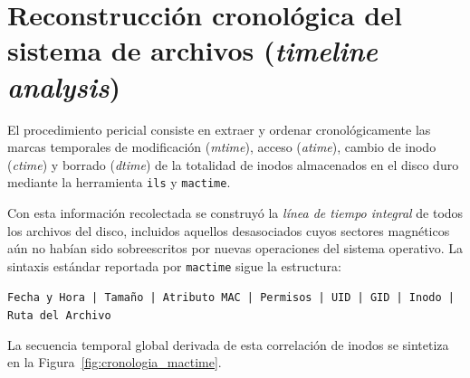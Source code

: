 \section{Reconstrucción cronológica del sistema de archivos (\textit{timeline analysis})}

El procedimiento pericial consiste en extraer y ordenar cronológicamente las marcas temporales de modificación (\textit{mtime}), acceso (\textit{atime}), cambio de inodo (\textit{ctime}) y borrado (\textit{dtime}) de la totalidad de inodos almacenados en el disco duro mediante la herramienta \texttt{ils} y \texttt{mactime}.

Con esta información recolectada se construyó la \emph{línea de tiempo integral} de todos los archivos del disco, incluidos aquellos desasociados cuyos sectores magnéticos aún no habían sido sobreescritos por nuevas operaciones del sistema operativo. La sintaxis estándar reportada por \texttt{mactime} sigue la estructura:

\noindent\texttt{Fecha y Hora | Tamaño | Atributo MAC | Permisos | UID | GID | Inodo | Ruta del Archivo}

La secuencia temporal global derivada de esta correlación de inodos se sintetiza en la Figura~\ref{fig:cronologia_mactime}.


